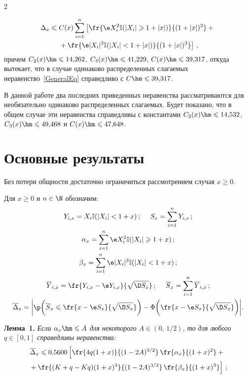 \begin{multicols}{2}
\vspace*{-12pt}

\noindent
\begin{multline*}
\Delta_x\leqslant C(x)\sum\limits_{i=1}^n\left[\fr{\e X_i^2\Iy(|X_i|\geqslant
1+|x|)}{(1+|x|)^2}+{}\right.\\
\left.{}+\fr{\e |X_i|^3\Iy(|X_i|<
1+|x|)}{(1+|x|)^3}\right]\,,
\end{multline*}
причем $C_2(x)\hm\leqslant 14{,}262$, $C_3(x)\hm\leqslant 41{,}229$, $C(x)\hm\leqslant 39{,}317$,
откуда вытекает, что в случае одинаково распределенных слагаемых
неравенство~\eqref{GeneralEq} справедливо с $C\hm\leqslant 39{,}317$.

В данной работе два последних приведенных нера\-вен\-ст\-ва рассматриваются
для необязательно одинаково распределенных слагаемых. Будет показано,
что в общем случае эти неравенства справедливы с константами
$C_2(x) \hm\leqslant 14{,}532$, $C_3(x)\hm\leqslant 49{,}468$
и $C(x)\hm\leqslant 47{,}648$.

\section{Основные результаты}

Без потери общности достаточно ограничиться
рассмотрением случая $x\geqslant 0$.

Для $x\geqslant 0$ и $n\in\N$ обозначим:
\begin{gather*}
Y_{i,x}=X_i \Iy (|X_i|<1+x)\,;\ \ \ \ S_x=\sum\limits_{i=1}^nY_{i,x}\,;
\\
\alpha_x=\sum\limits_{i=1}^n\e X_i^2\Iy (|X_i|\geqslant 1+x)\,;
\\
\beta_x=\sum\limits_{i=1}^n\e |X_i|^3\Iy (|X_i|<1+x)\,;
\\
\overline{Y}_{i,x}=\fr{Y_{i,x}-\e Y_{i,x}}{\sqrt{\D S_x}}\,;\ \ \
\ \overline{S}_x=\sum\limits_{i=1}^n\overline{Y}_{i,x}\,;
\\
\overline{\Delta}_x=\bigg |\p\bigg(\overline{S}_x\leqslant\fr{x-\e
S_x}{\sqrt{\D S_x}}\bigg)-\Phi\bigg(\fr{x-\e
S_x}{\sqrt{\D S_x}}\bigg)\bigg|.
\end{gather*}

\smallskip

\noindent
\textbf{Лемма~1.} %
\textit{Если $\alpha_x\hm\leqslant A$ для некоторого $A\in(0,\,1/2)$, то
для любого $q\in [0,1]$ справедливы неравенства:}
\begin{multline} 
\label{delta_overline_lemma_tmp_1}
\overline{\Delta}_x\leqslant 0{,}5600\left[
 \fr{4 q(1+x)}{(1-2A)^{3/2}}\, 
 \fr{\alpha_x}{(1+x)^2}+{}\right.\\
\left. {}+\fr{(K+q-Kq)(1+x)^3}{(1-2A)^{3/2}}\,
 \fr{\beta_x}{(1+x)^3}\right]\,;
\end{multline}


\end{multicols}
